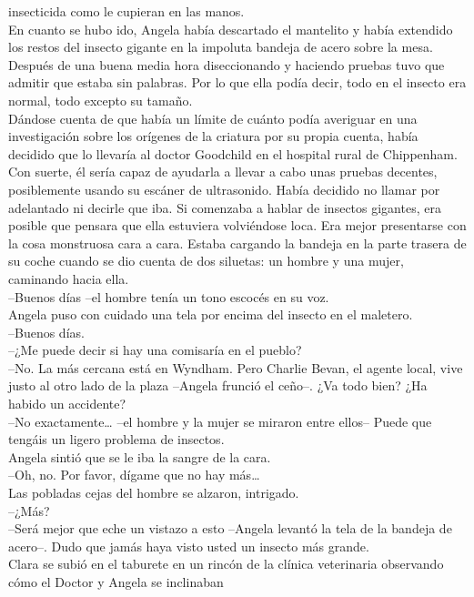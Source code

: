 {insecticida como le cupieran en las manos.\\
En cuanto se hubo ido, Angela había descartado el mantelito y había
extendido los restos del insecto gigante en la impoluta bandeja de acero
sobre la mesa. Después de una buena media hora diseccionando y haciendo
pruebas tuvo que admitir que estaba sin palabras. Por lo que ella podía
decir, todo en el insecto era normal, todo excepto su tamaño.\\
Dándose cuenta de que había un límite de cuánto podía averiguar en una
investigación sobre los orígenes de la criatura por su propia cuenta,
había decidido que lo llevaría al doctor Goodchild en el hospital rural
de Chippenham. Con suerte, él sería capaz de ayudarla a llevar a cabo
unas pruebas decentes, posiblemente usando su escáner de ultrasonido.
Había decidido no llamar por adelantado ni decirle que iba. Si comenzaba
a hablar de insectos gigantes, era posible que pensara que ella
estuviera volviéndose loca. Era mejor presentarse con la cosa monstruosa
cara a cara. Estaba cargando la bandeja en la parte trasera de su coche
cuando se dio cuenta de dos siluetas: un hombre y una mujer, caminando
hacia ella.\\
--Buenos días --el hombre tenía un tono escocés en su voz.\\
Angela puso con cuidado una tela por encima del insecto en el
maletero.\\
--Buenos días.\\
--¿Me puede decir si hay una comisaría en el pueblo?\\
--No. La más cercana está en Wyndham. Pero Charlie Bevan, el agente
local, vive justo al otro lado de la plaza --Angela frunció el ceño--.
¿Va todo bien? ¿Ha habido un accidente?\\
--No exactamente\ldots{} --el hombre y la mujer se miraron entre ellos--
Puede que tengáis un ligero problema de insectos.\\
Angela sintió que se le iba la sangre de la cara.\\
--Oh, no. Por favor, dígame que no hay más\ldots{}\\
Las pobladas cejas del hombre se alzaron, intrigado.\\
--¿Más?\\
--Será mejor que eche un vistazo a esto --Angela levantó la tela de la
bandeja de acero--. Dudo que jamás haya visto usted un insecto más
grande.\\[2\baselineskip]Clara se subió en el taburete en un rincón de
la clínica veterinaria observando cómo el Doctor y Angela se inclinaban
}
